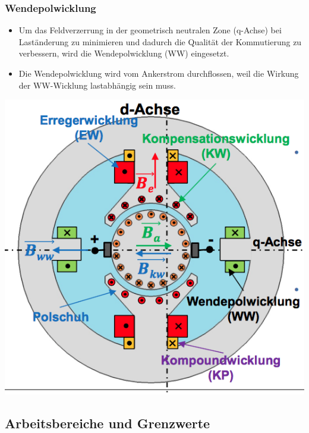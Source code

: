 \subsubsection{Wendepolwicklung}
\begin{minipage}{0.6 \linewidth}
\begin{itemize}
\item Um das Feldverzerrung in der geometrisch neutralen Zone (q-Achse) bei Laständerung zu minimieren und dadurch die Qualität der Kommutierung zu verbessern, wird die Wendepolwicklung (WW) eingesetzt. 
\item Die Wendepolwicklung wird vom Ankerstrom durchflossen, weil die Wirkung der WW-Wicklung lastabhängig sein muss.
\end{itemize}
\end{minipage}
\begin{minipage}{0.4 \linewidth}
\includegraphics[width = \linewidth]{./Pics/VL45/Wendepolwicklung}
\end{minipage}

\subsection{Arbeitsbereiche und Grenzwerte}

